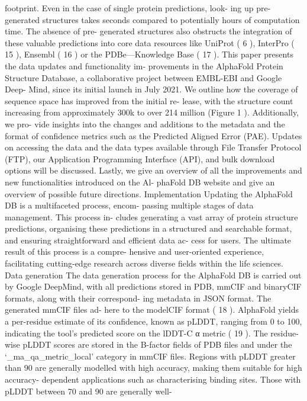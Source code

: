 footprint. Even in the case of single protein predictions, look-
ing up pre-generated structures takes seconds compared to
potentially hours of computation time. The absence of pre-
generated structures also obstructs the integration of these
valuable predictions into core data resources like UniProt ( 6 ),
InterPro ( 15 ), Ensembl ( 16 ) or the PDBe—Knowledge Base
( 17 ).
This paper presents the data updates and functionality im-
provements in the AlphaFold Protein Structure Database, a
collaborative project between EMBL-EBI and Google Deep-
Mind, since its initial launch in July 2021. We outline how the
coverage of sequence space has improved from the initial re-
lease, with the structure count increasing from approximately
300k to over 214 million (Figure 1 ). Additionally, we pro-
vide insights into the changes and additions to the metadata
and the format of confidence metrics such as the Predicted
Aligned Error (PAE). Updates on accessing the data and the
data types available through File Transfer Protocol (FTP), our
Application Programming Interface (API), and bulk download
options will be discussed. Lastly, we give an overview of all the
improvements and new functionalities introduced on the Al-
phaFold DB website and give an overview of possible future
directions.
Implementation
Updating the AlphaFold DB is a multifaceted process, encom-
passing multiple stages of data management. This process in-
cludes generating a vast array of protein structure predictions,
organising these predictions in a structured and searchable
format, and ensuring straightforward and efficient data ac-
cess for users. The ultimate result of this process is a compre-
hensive and user-oriented experience, facilitating cutting-edge
research across diverse fields within the life sciences.
Data generation
The data generation process for the AlphaFold DB is carried
out by Google DeepMind, with all predictions stored in PDB,
mmCIF and binaryCIF formats, along with their correspond-
ing metadata in JSON format. The generated mmCIF files ad-
here to the modelCIF format ( 18 ).
AlphaFold yields a per-residue estimate of its confidence,
known as pLDDT, ranging from 0 to 100, indicating the tool’s
predicted score on the lDDT-C α metric ( 19 ). The residue-wise
pLDDT scores are stored in the B-factor fields of PDB files
and under the ‘\_ma\_qa\_metric\_local’ category in mmCIF files.
Regions with pLDDT greater than 90 are generally modelled
with high accuracy, making them suitable for high accuracy-
dependent applications such as characterising binding sites.
Those with pLDDT between 70 and 90 are generally well-

